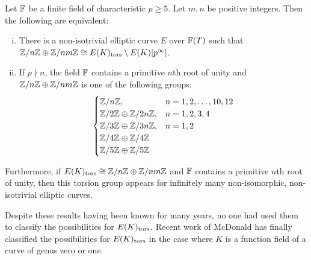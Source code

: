 \begin{thm}
Let $\mathbb{F}$ be a finite field of characteristic $p \geq 5$. Let $m,n$ be positive integers. Then the following are equivalent:
	\begin{enumerate}[(i)]
	\item There is a non-isotrivial elliptic curve $E$ over $\mathbb{F}(T)$ such that $\mathbb{Z}/n\mathbb{Z} \oplus \mathbb{Z}/nm\mathbb{Z} \cong E(K)_{\text{tors}} \setminus E(K)[p^\infty]$.
	\item If $p \nmid n$, the field $\mathbb{F}$ contains a primitive $n$th root of unity and $\mathbb{Z}/n\mathbb{Z} \oplus \mathbb{Z}/nm\mathbb{Z}$ is one of the following groups:
		\[
		\begin{cases}
		\mathbb{Z}/n\mathbb{Z}, & n= 1, 2, \ldots, 10, 12 \\
		\mathbb{Z}/2\mathbb{Z} \oplus \mathbb{Z}/2n\mathbb{Z}, & n= 1, 2, 3, 4 \\
		\mathbb{Z}/3\mathbb{Z} \oplus \mathbb{Z}/3n\mathbb{Z}, & n= 1, 2 \\
		\mathbb{Z}/4\mathbb{Z} \oplus \mathbb{Z}/4\mathbb{Z} \\
		\mathbb{Z}/5\mathbb{Z} \oplus \mathbb{Z}/5\mathbb{Z}
		\end{cases}
		\]
	\end{enumerate}
Furthermore, if $E(K)_{\text{tors}} \cong \mathbb{Z}/n\mathbb{Z} \oplus \mathbb{Z}/nm\mathbb{Z}$ and $\mathbb{F}$ contains a primitive $n$th root of unity, then this torsion group appears for infinitely many non-isomorphic, non-isotrivial elliptic curves.
\end{thm}


Despite these results having been known for many years, no one had used them to classify the possibilities for $E(K)_{\text{tors}}$. Recent work of McDonald has finally classified the possibilities for $E(K)_{\text{tors}}$ in the case where $K$ is a function field of a curve of genus zero or one. 



